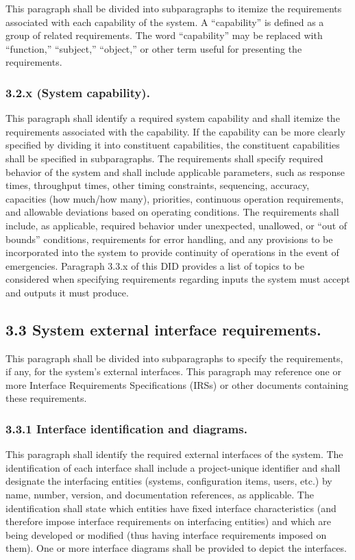 This paragraph shall be divided into subparagraphs to itemize the
requirements associated with each capability of the system. A
``capability'' is defined as a group of related requirements. The word
``capability'' may be replaced with ``function,'' ``subject,''
``object,'' or other term useful for presenting the requirements.

\subsubsection{3.2.x (System capability).}

This paragraph shall identify a required system capability and shall
itemize the requirements associated with the capability. If the
capability can be more clearly specified by dividing it into constituent
capabilities, the constituent capabilities shall be specified in
subparagraphs. The requirements shall specify required behavior of the
system and shall include applicable parameters, such as response times,
throughput times, other timing constraints, sequencing, accuracy,
capacities (how much/how many), priorities, continuous operation
requirements, and allowable deviations based on operating conditions.
The requirements shall include, as applicable, required behavior under
unexpected, unallowed, or ``out of bounds'' conditions, requirements for
error handling, and any provisions to be incorporated into the system to
provide continuity of operations in the event of emergencies. Paragraph
3.3.x of this DID provides a list of topics to be considered when
specifying requirements regarding inputs the system must accept and
outputs it must produce.

\subsection{3.3 System external interface requirements.}

This paragraph shall be divided into subparagraphs to specify the
requirements, if any, for the system's external interfaces. This
paragraph may reference one or more Interface Requirements
Specifications (IRSs) or other documents containing these requirements.

\subsubsection{3.3.1 Interface identification and diagrams.}

This paragraph shall identify the required external interfaces of the
system. The identification of each interface shall include a
project-unique identifier and shall designate the interfacing entities
(systems, configuration items, users, etc.) by name, number, version,
and documentation references, as applicable. The identification shall
state which entities have fixed interface characteristics (and therefore
impose interface requirements on interfacing entities) and which are
being developed or modified (thus having interface requirements imposed
on them). One or more interface diagrams shall be provided to depict the
interfaces.

